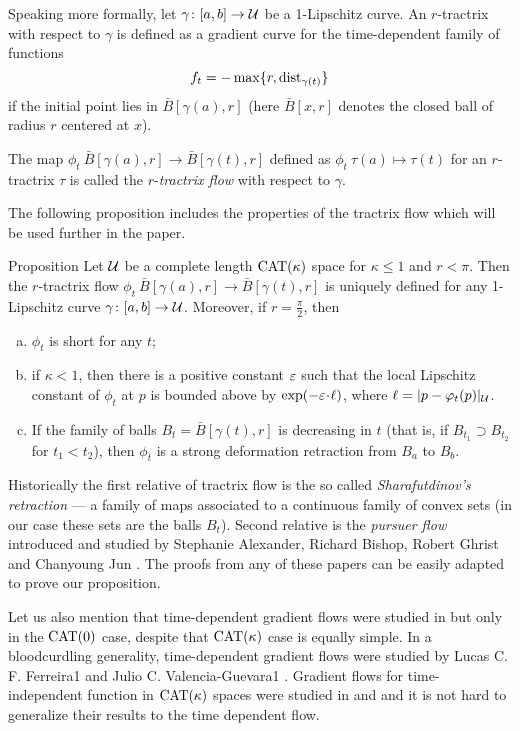 \documentclass[oneside,a4paper, 12pt]{article}
\begin{document}
Speaking more formally, let $\gamma\colon[a,b]\to \mathcal{U}$ be a 1-Lipschitz curve. 
An $r$-tractrix with respect to $\gamma$ is defined as a gradient curve for the time-dependent family of functions 
\[f_t=- \max\{r,\mathop{\rm dist}\nolimits_{\gamma(t)}\}\]
if the initial point lies in $\bar B[\gamma(a),r]$
(here $\bar B[x,r]$ denotes the closed ball of radius $r$ centered at $x$).

The map $\phi_t\:\bar B[\gamma(a),r]\to\bar B[\gamma(t),r] $ defined as $\phi_t\:\tau(a)\mapsto \tau(t)$ 
for an $r$-tractrix $\tau$
is called the $r$-\emph{tractrix flow} with respect to $\gamma$.

The following proposition includes the properties of the tractrix flow which will be used further in the paper.

\begin{thm}{Proposition}\label{prop-def}
Let $\mathcal{U}$ be a complete length $\mathrm{CAT}(\kappa)$ space for $\kappa\le 1$ and $r<\pi$.
Then the $r$-tractrix flow $\phi_t\:\bar B[\gamma(a),r]\to\bar B[\gamma(t),r]$ is uniquely defined for any  1-Lipschitz curve $\gamma\colon[a,b]\to \mathcal{U}$.
Moreover, if $r=\tfrac\pi2$, then
\begin{enumerate}[(a)]
 \item $\phi_t$ is short for any $t$;
 \item if $\kappa<1$, then there is a positive constant $\varepsilon$ such that the local Lipschitz constant of $\phi_t$ at $p$ is bounded above by $\exp(-\eps\cdot\ell)$, where $\ell=|p-\varphi_t(p)|_{\mathcal{U}}$.
 \item\label{sharafutdinov} If the family of balls $B_t=\bar B[\gamma(t),r]$ is decreasing in $t$ (that is, if $B_{t_1}\supset B_{t_2}$ for $t_1<t_2$), then $\phi_t$ is a strong deformation retraction from $B_a$ to $B_b$.
\end{enumerate}
\end{thm}

Historically the first relative of tractrix flow
is the so called \emph{Sharafutdinov's retraction} \cite{sharafutdinov} --- a family of maps associated to a continuous family of convex sets (in our case these sets are the balls $B_t$). 
Second relative is the \emph{pursuer flow} introduced and studied by Stephanie Alexander, Richard Bishop, Robert Ghrist and Chanyoung Jun \cite{ABG,jun-thesis,jun,jun:grad}.
The proofs from any of these papers can be easily adapted to prove our proposition.

Let us also mention that time-dependent gradient flows were studied in \cite{jun-thesis,jun:grad} but only in the $\mathrm{CAT}(0)$ case, despite that $\mathrm{CAT}(\kappa)$ case is equally simple.
In a bloodcurdling generality, time-dependent gradient flows were studied by Lucas C. F. Ferreira1 and Julio C. Valencia-Guevara1 \cite{ferreira-valencia}.
Gradient flows for time-independent function in $\mathrm{CAT}(\kappa)$ spaces were studied in \cite{lytchak-open-map} and \cite{ohta-palfia} and it is not hard to generalize their results to the time dependent flow.
\end{document}
